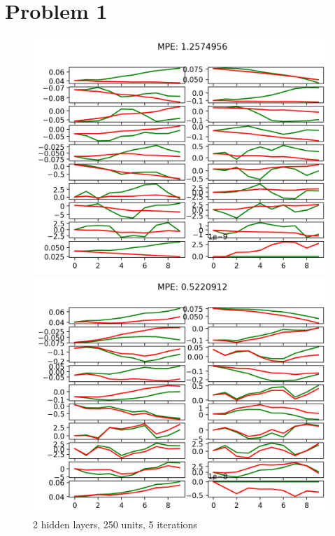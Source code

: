 \documentclass[letterpaper, 10pt]{article}
\begin{document}
\section*{Problem 1}
\begin{figure}[h]
	\centering
    \begin{minipage}{0.32\textwidth}
        \centering
        \includegraphics[width=\textwidth]{itr_0_predictions_n5_arch2x250}
        \caption{2 hidden layers, 250 units, 5 iterations}
    \end{minipage} \hfill
    \begin{minipage}{0.32\textwidth}
        \centering
        \includegraphics[width=\textwidth]{itr_0_predictions_n500_arch1x32}

\end{minipage}
\end{figure}
\end{document}
